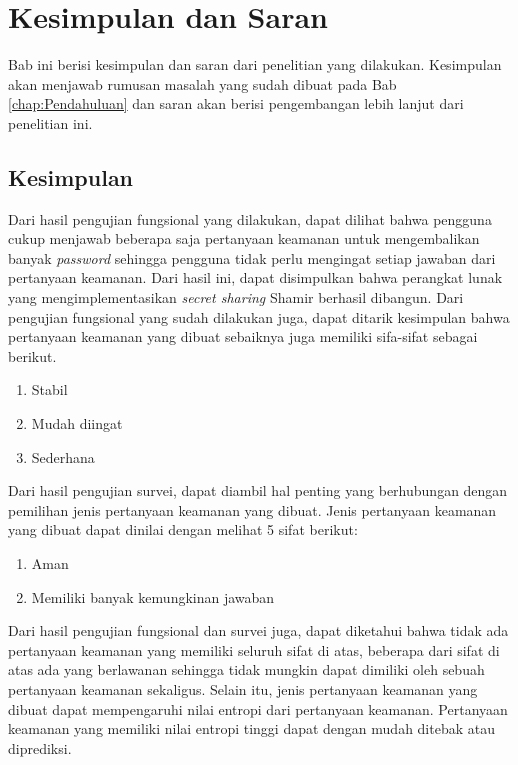 \chapter{Kesimpulan dan Saran}
\label{chap:Kesimpulan dan Saran}

Bab ini berisi kesimpulan dan saran dari penelitian yang dilakukan. Kesimpulan akan menjawab rumusan masalah yang sudah dibuat pada Bab \ref{chap:Pendahuluan} dan saran akan berisi pengembangan lebih lanjut dari penelitian ini.

\section{Kesimpulan}

Dari hasil pengujian fungsional yang dilakukan, dapat dilihat bahwa pengguna cukup menjawab beberapa saja pertanyaan keamanan untuk mengembalikan banyak \textit{password} sehingga pengguna tidak perlu mengingat setiap jawaban dari pertanyaan keamanan. Dari hasil ini, dapat disimpulkan bahwa perangkat lunak yang mengimplementasikan \textit{secret sharing} Shamir berhasil dibangun. Dari pengujian fungsional yang sudah dilakukan juga, dapat ditarik kesimpulan bahwa pertanyaan keamanan yang dibuat sebaiknya juga memiliki sifa-sifat sebagai berikut.

\begin{enumerate}[itemsep=0mm]
	\item Stabil
	\item Mudah diingat
	\item Sederhana
\end{enumerate}

Dari hasil pengujian survei, dapat diambil hal penting yang berhubungan dengan pemilihan jenis pertanyaan keamanan yang dibuat. Jenis pertanyaan keamanan yang dibuat dapat dinilai dengan melihat 5 sifat berikut:

\begin{enumerate}[itemsep=0mm]
	\item Aman
	\item Memiliki banyak kemungkinan jawaban
\end{enumerate}

Dari hasil pengujian fungsional dan survei juga, dapat diketahui bahwa tidak ada pertanyaan keamanan yang memiliki seluruh sifat di atas, beberapa dari sifat di atas ada yang berlawanan sehingga tidak mungkin dapat dimiliki oleh sebuah pertanyaan keamanan sekaligus. Selain itu, jenis pertanyaan keamanan yang dibuat dapat mempengaruhi nilai entropi dari pertanyaan keamanan. Pertanyaan keamanan yang memiliki nilai entropi tinggi dapat dengan mudah ditebak atau diprediksi.

